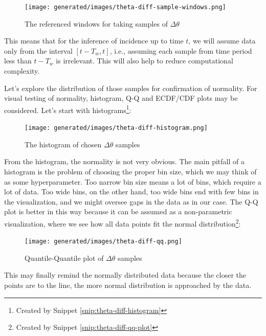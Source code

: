 \documentclass[
  digital, %
  oneside, %
  lof,     %
  lot,     %
]{fithesis4}
\begin{document}
\begin{figure}[H]
  \begin{center}
    \texttt{[image: generated/images/theta-diff-sample-windows.png]}
  \end{center}
  \caption{The referenced windows for taking samples of $\Delta \theta$}
  \label{fig:theta-sample-windows}
\end{figure}

This means that for the inference of incidence up to time $t$, we will assume data only from the interval $[t - T_w, t]$, i.e., assuming each sample from time period less than $t - T_w$ is irrelevant.
This will also help to reduce computational complexity.

Let's explore the distribution of those samples for confirmation of normality. 
For visual testing of normality, histogram, Q-Q and ECDF/CDF plots may be considered.
Let's start with histograms\footnote{Created by Snippet \ref{snip:theta-diff-histogram}}:

\begin{figure}[H]
  \begin{center}
    \texttt{[image: generated/images/theta-diff-histogram.png]}
  \end{center}
  \caption{The histogram of chosen $\Delta \theta$ samples}
  \label{fig:theta-diff-histogram}
\end{figure}

From the histogram, the normality is not very obvious.
The main pitfall of a histogram is the problem of choosing the proper bin size, which we may think of as some hyperparameter.
Too narrow bin size means a lot of bins, which require a lot of data.
Too wide bins, on the other hand, too wide bins end with few bins in the visualization, and we might oversee gaps in the data as in our case.
The Q-Q plot is better in this way because it can be assumed as a non-parametric visualization, where we see how all data points fit the normal distribution\footnote{Created by Snippet \ref{snip:theta-diff-qq-plot}}:

\begin{figure}[H]
  \begin{center}
    \texttt{[image: generated/images/theta-diff-qq.png]}
  \end{center}
  \caption{Quantile-Quantile plot of $\Delta \theta$ samples}
  \label{fig:theta-diff-qq}
\end{figure}


This may finally remind the normally distributed data because the closer the points are to the line, the more normal distribution is approached by the data.
\end{document}
